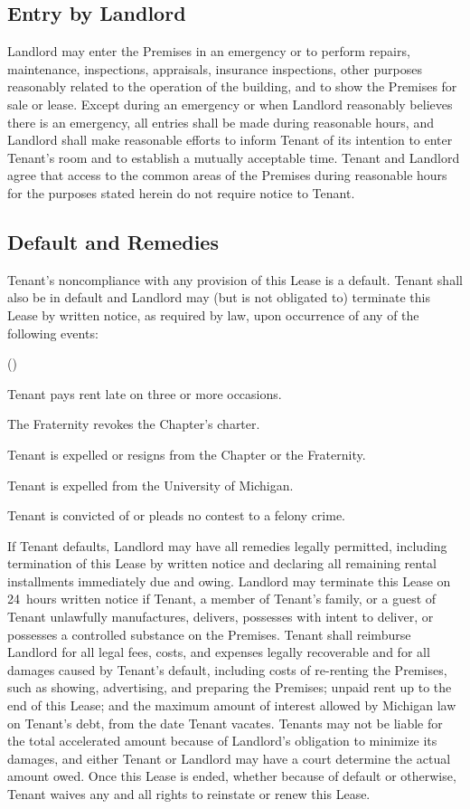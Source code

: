 \documentclass{article}
\begin{document}
\subsection{Entry by Landlord}
Landlord may enter the Premises in an emergency or to perform repairs,
maintenance, inspections, appraisals, insurance inspections, other purposes
reasonably related to the operation of the building, and to show the Premises
for sale or lease. Except during an emergency or when Landlord reasonably
believes there is an emergency, all entries shall be made during reasonable
hours, and Landlord shall make reasonable efforts to inform Tenant of its
intention to enter Tenant’s room and to establish a mutually acceptable time.
Tenant and Landlord agree that access to the common areas of the Premises during
reasonable hours for the purposes stated herein do not require notice to
Tenant.

\subsection{Default and Remedies}\label{Default and Remedies}
Tenant’s noncompliance with any provision of this Lease is a default. Tenant
shall also be in default and Landlord may (but is not obligated to) terminate
this Lease by written notice, as required by law, upon occurrence of any of the
following events:

\begin{compactList}{()}{}
  \item Tenant pays rent late on three or more occasions.
  \item The Fraternity revokes the Chapter’s charter.
  \item Tenant is expelled or resigns from the Chapter or the Fraternity.
  \item Tenant is expelled from the University of Michigan.
  \item Tenant is convicted of or pleads no contest to a felony crime.
\end{compactList}

If Tenant defaults, Landlord may have all remedies legally permitted, including
termination of this Lease by written notice and declaring all remaining rental
installments immediately due and owing. Landlord may terminate this Lease on
24~hours written notice if Tenant, a member of Tenant’s family, or a guest of
Tenant unlawfully manufactures, delivers, possesses with intent to deliver, or
possesses a controlled substance on the Premises. Tenant shall reimburse
Landlord for all legal fees, costs, and expenses legally recoverable and for all
damages caused by Tenant’s default, including costs of re-renting the Premises,
such as showing, advertising, and preparing the Premises; unpaid rent up to the
end of this Lease; and the maximum amount of interest allowed by Michigan law on
Tenant’s debt, from the date Tenant vacates. Tenants may not be liable for the
total accelerated amount because of Landlord’s obligation to minimize its
damages, and either Tenant or Landlord may have a court determine the actual
amount owed. Once this Lease is ended, whether because of default or otherwise,
Tenant waives any and all rights to reinstate or renew this Lease.
\end{document}
